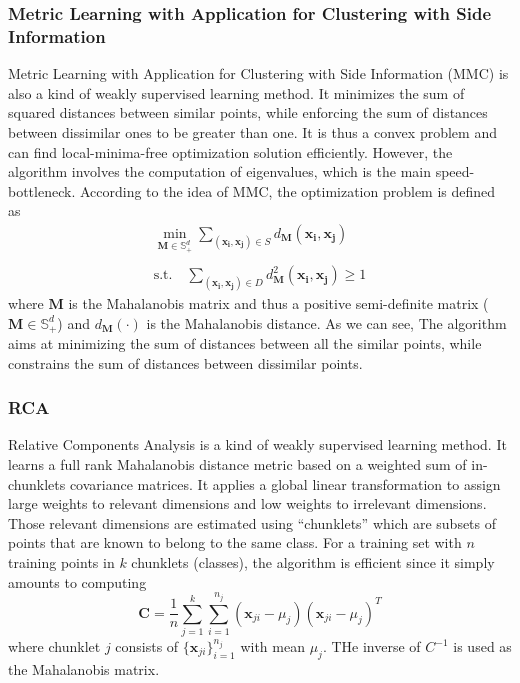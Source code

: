 \documentclass[conference]{IEEEtran}
\begin{document}
\subsubsection{Metric Learning with Application for Clustering with Side Information}
\par
Metric Learning with Application for Clustering with Side Information (MMC) \cite{xing2003distance} is also a kind of weakly supervised learning method. It minimizes the sum of squared distances between similar points, while enforcing the sum of distances between dissimilar ones to be greater than one.
It is thus a convex problem and can find local-minima-free optimization solution efficiently. However, the algorithm involves the computation of eigenvalues, which is the main speed-bottleneck.
According to the idea of MMC, the optimization problem is defined as
\begin{equation}
	\begin{array}{c}
		\min_{\mathbf{M}\in\mathbb{S}^d_+}\sum_{(\mathbf{x_i},\mathbf{x_j})\in S}d_{\mathbf{M}}(\mathbf{x_i},\mathbf{x_j})\\
		\\
		\text{s.t.} \quad \sum_{(\mathbf{x_i},\mathbf{x_j})\in D}d_{\mathbf{M}}^2(\mathbf{x_i},\mathbf{x_j})\ge 1
	\end{array}
\end{equation}
where $\mathbf{M}$ is the Mahalanobis matrix and thus a positive semi-definite matrix ($\mathbf{M}\in\mathbb{S}^d_+$) and $d_{\mathbf{M}}(\cdot)$ is the Mahalanobis distance. As we can see, The algorithm aims at minimizing the sum of distances between all the similar points, while constrains the sum of distances between dissimilar points.
\subsubsection{RCA}
\par
Relative Components Analysis \cite{shental2002adjustment} is a kind of weakly supervised learning method. It learns a full rank Mahalanobis distance metric based on a weighted sum of in-chunklets covariance matrices. It applies a global linear transformation to assign large weights to relevant dimensions and low weights to irrelevant dimensions. 
Those relevant dimensions are estimated using “chunklets” which are subsets of points that are known to belong to the same class.
For a training set with $n$ training points in $k$ chunklets (classes), the algorithm is efficient since it simply amounts to computing
\begin{equation}
	\mathbf{C}=\dfrac{1}{n}\sum_{j=1}^k\sum_{i=1}^{n_j}(\mathbf{x}_{ji}-\mu_j)(\mathbf{x}_{ji}-\mu_j)^T
\end{equation}
where chunklet $j$ consists of $\{\mathbf{x}_{ji}\}^{n_j}_{i=1}$ with mean $\mu_j$. THe inverse of $C^{-1}$ is used as the Mahalanobis matrix.
\end{document}
